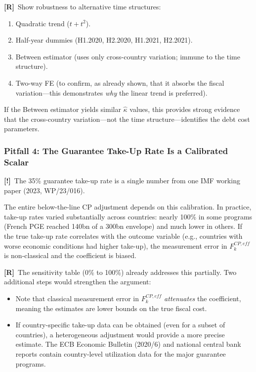 \documentclass[12pt, a4paper]{article}
\newcommand{\concern}[1]{\textcolor{concern}{\textbf{[!]}~#1}}
\newcommand{\recommend}[1]{\textcolor{recommend}{\textbf{[R]}~#1}}
\begin{document}
\recommend{Show robustness to alternative time structures:}
\begin{enumerate}[label=(\alph*)]
    \item Quadratic trend ($t + t^2$).
    \item Half-year dummies (H1.2020, H2.2020, H1.2021, H2.2021).
    \item Between estimator (uses only cross-country variation; immune to the time structure).
    \item Two-way FE (to confirm, as already shown, that it absorbs the fiscal variation---this demonstrates \textit{why} the linear trend is preferred).
\end{enumerate}
If the Between estimator yields similar $\hat{\kappa}$ values, this provides strong evidence that the cross-country variation---not the time structure---identifies the debt cost parameters.


\subsubsection*{Pitfall 4: The Guarantee Take-Up Rate Is a Calibrated Scalar}

\concern{The 35\% guarantee take-up rate is a single number from one IMF working paper (2023, WP/23/016).}

The entire below-the-line CP adjustment depends on this calibration. In practice, take-up rates varied substantially across countries: nearly 100\% in some programs (French PGE reached \texteuro 140bn of a \texteuro 300bn envelope) and much lower in others. If the true take-up rate correlates with the outcome variable (e.g., countries with worse economic conditions had higher take-up), the measurement error in $F_k^{CP,eff}$ is non-classical and the coefficient is biased.

\recommend{The sensitivity table (0\% to 100\%) already addresses this partially.} Two additional steps would strengthen the argument:
\begin{itemize}
    \item Note that classical measurement error in $F_k^{CP,eff}$ \textit{attenuates} the coefficient, meaning the estimates are lower bounds on the true fiscal cost.
    \item If country-specific take-up data can be obtained (even for a subset of countries), a heterogeneous adjustment would provide a more precise estimate. The ECB Economic Bulletin (2020/6) and national central bank reports contain country-level utilization data for the major guarantee programs.
\end{itemize}
\end{document}
